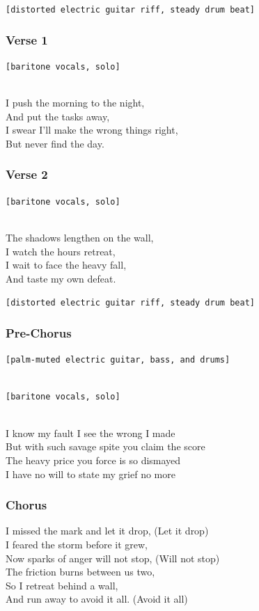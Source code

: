 \texttt{{[}distorted\ electric\ guitar\ riff,\ steady\ drum\ beat{]}}

\subsubsection{Verse 1}\label{verse-1-10}

\texttt{{[}baritone\ vocals,\ solo{]}}\strut \\
I push the morning to the night,\\
And put the tasks away,\\
I swear I'll make the wrong things right,\\
But never find the day.

\subsubsection{Verse 2}\label{verse-2-11}

\texttt{{[}baritone\ vocals,\ solo{]}}\strut \\
The shadows lengthen on the wall,\\
I watch the hours retreat,\\
I wait to face the heavy fall,\\
And taste my own defeat.

\texttt{{[}distorted\ electric\ guitar\ riff,\ steady\ drum\ beat{]}}

\subsubsection{Pre-Chorus}\label{pre-chorus-11}

\texttt{{[}palm-muted\ electric\ guitar,\ bass,\ and\ drums{]}}\strut \\
\texttt{{[}baritone\ vocals,\ solo{]}}\strut \\
I know my fault I see the wrong I made\\
But with such savage spite you claim the score\\
The heavy price you force is so dismayed\\
I have no will to state my grief no more

\subsubsection{Chorus}\label{chorus-26}

I missed the mark and let it drop, (Let it drop)\\
I feared the storm before it grew,\\
Now sparks of anger will not stop, (Will not stop)\\
The friction burns between us two,\\
So I retreat behind a wall,\\
And run away to avoid it all. (Avoid it all)

